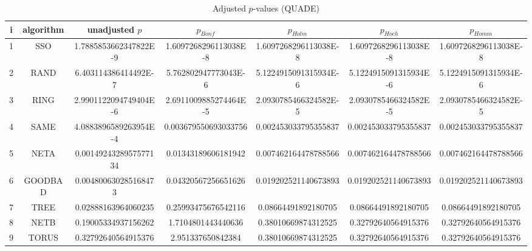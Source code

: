 \documentclass[a4paper,10pt]{article}
\begin{document}
\begin{landscape}
\begin{table}[!htp]
\centering\scriptsize
\caption{Adjusted $p$-values (QUADE)}
\begin{tabular}{ccccccc}
i&algorithm&unadjusted $p$&$p_{Bonf}$&$p_{Holm}$&$p_{Hoch}$&$p_{Homm}$\\
\hline
1& SSO&1.7885853662347822E-9&1.6097268296113038E-8&1.6097268296113038E-8&1.6097268296113038E-8&1.6097268296113038E-8\\
2& RAND&6.403114386414492E-7&5.762802947773043E-6&5.1224915091315934E-6&5.1224915091315934E-6&5.1224915091315934E-6\\
3& RING&2.9901122094749404E-6&2.6911009885274464E-5&2.0930785466324582E-5&2.0930785466324582E-5&2.0930785466324582E-5\\
4& SAME&4.0883896589263954E-4&0.003679550693033756&0.002453033795355837&0.002453033795355837&0.002453033795355837\\
5& NETA&0.0014924328957577134&0.01343189606181942&0.007462164478788566&0.007462164478788566&0.007462164478788566\\
6& GOODBAD&0.004800630285168473&0.04320567256651626&0.019202521140673893&0.019202521140673893&0.019202521140673893\\
7& TREE&0.02888163964060235&0.25993475676542116&0.08664491892180705&0.08664491892180705&0.08664491892180705\\
8& NETB&0.19005334937156262&1.7104801443440636&0.38010669874312525&0.32792640564915376&0.32792640564915376\\
9& TORUS&0.32792640564915376&2.951337650842384&0.38010669874312525&0.32792640564915376&0.32792640564915376\\
\hline
\end{tabular}
\end{table}


\end{landscape}
\end{document}
